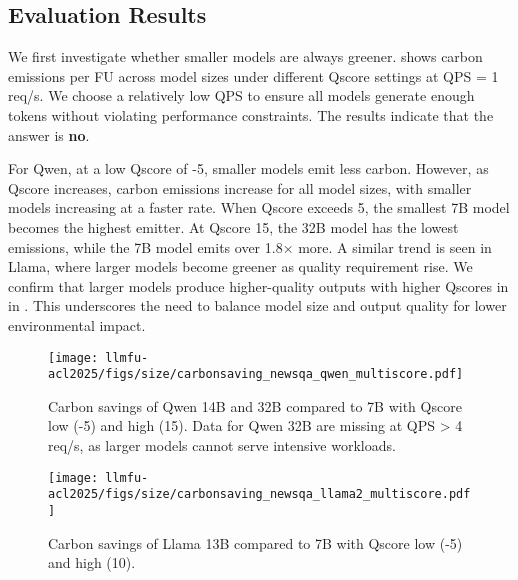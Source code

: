 \subsection{Evaluation Results}

We first investigate whether smaller models are always greener.  shows carbon emissions per FU across model sizes under different Qscore settings at QPS = 1 req/s. We choose a relatively low QPS to ensure all models generate enough tokens without violating performance constraints. The results indicate that the answer is \textbf{no}.  

For Qwen, at a low Qscore of -5, smaller models emit less carbon. However, as Qscore increases, carbon emissions increase for all model sizes, with smaller models increasing at a faster rate. When Qscore exceeds 5, the smallest 7B model becomes the highest emitter. At Qscore 15, the 32B model has the lowest emissions, while the 7B model emits over 1.8× more. A similar trend is seen in Llama, where larger models become greener as quality requirement rise. We confirm that larger models produce higher-quality outputs with higher Qscores in  in . This underscores the need to balance model size and output quality for lower environmental impact.
\begin{figure}[!t]
    \centering
    \texttt{[image: llmfu-acl2025/figs/size/carbonsaving\_newsqa\_qwen\_multiscore.pdf]}
    \vspace{-0.15in}
    \caption{Carbon savings of Qwen 14B and 32B compared to 7B with Qscore low (-5) and high (15). Data for Qwen 32B are missing at QPS > 4 req/s, as larger models cannot serve intensive workloads.}
    \label{fig:size_newsqa_cs_qwen}
\end{figure}

\begin{figure}[!t]
    \centering
    \texttt{[image: llmfu-acl2025/figs/size/carbonsaving\_newsqa\_llama2\_multiscore.pdf]}
    \vspace{-0.15in}
    \caption{Carbon savings of Llama 13B compared to 7B with Qscore low (-5) and high (10).}
    \label{fig:size_newsqa_cs_llama}
\end{figure}

